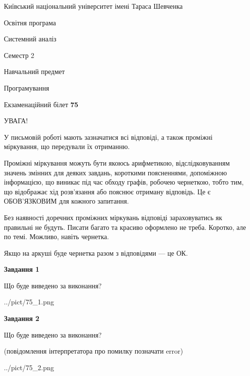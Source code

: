 \documentclass[12pt, ukrainian]{article}
\begin{document}
{{\begin {small}\par
{ \center  Київський національний університет імені Тараса Шевченка \par}
{\parbox {5 cm}{Освітня програма \hfill}{\parbox {7 cm}{Системний аналіз \hfill}}\parbox {6 cm}{\hfill Семестр 2}}\par
{\parbox {5 cm} {Навчальний предмет \hfill}\parbox {7 cm}{Програмування \hfill}\parbox {6cm}{\hfill}\par}\vspace{-7pt} \end{small}}{\center Екзаменаційний білет \No \textbf
{ 75 }\par}}
{
\begin {large}
УВАГА!

У письмовій роботі мають зазначатися всі відповіді, а також проміжні міркування, що передували їх отриманню.

Проміжні міркування можуть бути якоюсь арифметикою, відслідковуванням зна\-чень змінних для деяких завдань,
короткими поясненнями, допоміжною інформацією, що виникає під час обходу графів, робочею чернеткою,
тобто тим, що відображає хід розв’язання або пояснює отриману відповідь.
Це є ОБОВ’ЯЗКОВИМ для кожного запитання.

Без наявності доречних проміжних міркувань відповіді зараховуватись як правиль\-ні не будуть.
Писати багато та красиво оформлено не треба. Коротко, але по темі. Можли\-во, навіть чернетка.

Якщо на аркуші буде чернетка разом з відповідями --- це ОК.

\newpage

{\begin {center}\textbf{Завдання 1}\end {center}}\par
Що буде виведено за виконання?\par
\begin{center}
	{../pict/75_1.png}
\end{center}
\newpage

{\begin {center}\textbf{Завдання 2}\end {center}}\par
Що буде виведено за виконання?\par
 (повідомлення інтерпретатора про помилку позначати error)\par
\begin{center}
	{../pict/75_2.png}
\end{center}
\newpage


\end{large}}
\end{document}
